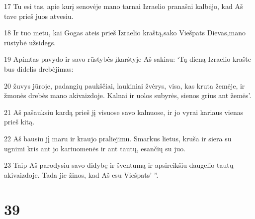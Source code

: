 \par 17 Tu esi tas, apie kurį senovėje mano tarnai Izraelio pranašai kalbėjo, kad Aš tave prieš juos atvesiu. 
\par 18 Ir tuo metu, kai Gogas ateis prieš Izraelio kraštą,­sako Viešpats Dievas,­mano rūstybė užsidegs. 
\par 19 Apimtas pavydo ir savo rūstybės įkarštyje Aš sakiau: ‘Tą dieną Izraelio krašte bus didelis drebėjimas: 
\par 20 žuvys jūroje, padangių paukščiai, laukiniai žvėrys, visa, kas kruta žemėje, ir žmonės drebės mano akivaizdoje. Kalnai ir uolos subyrės, sienos grius ant žemės’. 
\par 21 Aš pašauksiu kardą prieš jį visuose savo kalnuose, ir jo vyrai kariaus vienas prieš kitą. 
\par 22 Aš bausiu jį maru ir kraujo praliejimu. Smarkus lietus, kruša ir siera su ugnimi kris ant jo kariuomenės ir ant tautų, esančių su juo. 
\par 23 Taip Aš parodysiu savo didybę ir šventumą ir apsireikšiu daugelio tautų akivaizdoje. Tada jie žinos, kad Aš esu Viešpats’ ”.



\chapter{39}


